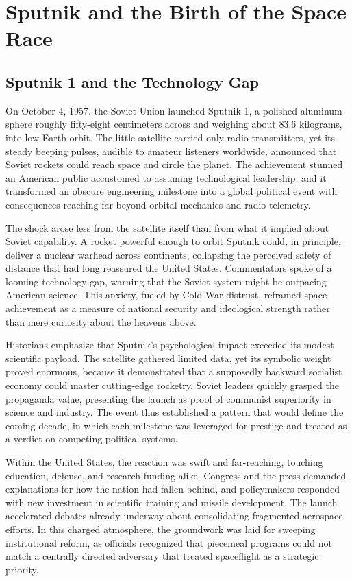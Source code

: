 \section{Sputnik and the Birth of the Space Race}

\subsection{Sputnik 1 and the Technology Gap}
On October 4, 1957, the Soviet Union launched Sputnik 1, a polished aluminum sphere roughly fifty-eight centimeters across and weighing about 83.6 kilograms, into low Earth orbit. The little satellite carried only radio transmitters, yet its steady beeping pulses, audible to amateur listeners worldwide, announced that Soviet rockets could reach space and circle the planet. The achievement stunned an American public accustomed to assuming technological leadership, and it transformed an obscure engineering milestone into a global political event with consequences reaching far beyond orbital mechanics and radio telemetry.

The shock arose less from the satellite itself than from what it implied about Soviet capability. A rocket powerful enough to orbit Sputnik could, in principle, deliver a nuclear warhead across continents, collapsing the perceived safety of distance that had long reassured the United States. Commentators spoke of a looming technology gap, warning that the Soviet system might be outpacing American science. This anxiety, fueled by Cold War distrust, reframed space achievement as a measure of national security and ideological strength rather than mere curiosity about the heavens above.

Historians emphasize that Sputnik's psychological impact exceeded its modest scientific payload. The satellite gathered limited data, yet its symbolic weight proved enormous, because it demonstrated that a supposedly backward socialist economy could master cutting-edge rocketry. Soviet leaders quickly grasped the propaganda value, presenting the launch as proof of communist superiority in science and industry. The event thus established a pattern that would define the coming decade, in which each milestone was leveraged for prestige and treated as a verdict on competing political systems.

Within the United States, the reaction was swift and far-reaching, touching education, defense, and research funding alike. Congress and the press demanded explanations for how the nation had fallen behind, and policymakers responded with new investment in scientific training and missile development. The launch accelerated debates already underway about consolidating fragmented aerospace efforts. In this charged atmosphere, the groundwork was laid for sweeping institutional reform, as officials recognized that piecemeal programs could not match a centrally directed adversary that treated spaceflight as a strategic priority.

